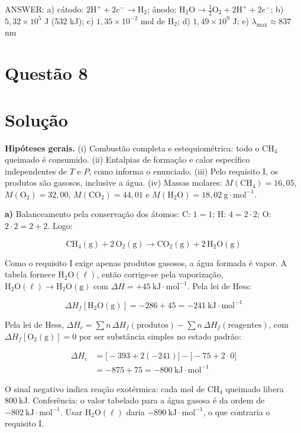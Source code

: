 \documentclass{article}%
\begin{document}
ANSWER: a) cátodo: $2\text{H}^{+}+2e^{-}\rightarrow\text{H}_2$; ânodo: $\text{H}_2\text{O}\rightarrow\tfrac{1}{2}\text{O}_2+2\text{H}^{+}+2e^{-}$; b) $5{,}32\times10^{5}$ J (532 kJ); c) $1{,}35\times10^{-2}$ mol de $\text{H}_2$; d) $1{,}49\times10^{9}$ J; e) $\lambda_{\max}\approx 837$ nm
%
\newpage%
\section*{Questão 8}

\section*{Solução}

\textbf{Hipóteses gerais.} (i) Combustão completa e estequiométrica: todo o CH$_4$ queimado é consumido. (ii) Entalpias de formação e calor específico independentes de $T$ e $P$, como informa o enunciado. (iii) Pelo requisito I, os produtos são gasosos, inclusive a água. (iv) Massas molares: $M(\mathrm{CH_4})=16{,}05$, $M(\mathrm{O_2})=32{,}00$, $M(\mathrm{CO_2})=44{,}01$ e $M(\mathrm{H_2O})=18{,}02\ \text{g}\cdot\text{mol}^{-1}$.

\textbf{a)} Balanceamento pela conservação dos átomos: C: $1=1$; H: $4=2\cdot2$; O: $2\cdot2=2+2$. Logo:

\[ \mathrm{CH_4(g)}+2\,\mathrm{O_2(g)}\rightarrow\mathrm{CO_2(g)}+2\,\mathrm{H_2O(g)} \]

Como o requisito I exige apenas produtos gasosos, a água formada é vapor. A tabela fornece $\mathrm{H_2O(\ell)}$, então corrige-se pela vaporização, $\mathrm{H_2O(\ell)}\rightarrow\mathrm{H_2O(g)}$ com $\Delta H=+45\ \text{kJ}\cdot\text{mol}^{-1}$. Pela lei de Hess:

\[ \Delta H_f[\mathrm{H_2O(g)}]=-286+45=-241\ \text{kJ}\cdot\text{mol}^{-1} \]

Pela lei de Hess, $\Delta H_c=\sum n\,\Delta H_f(\text{produtos})-\sum n\,\Delta H_f(\text{reagentes})$, com $\Delta H_f[\mathrm{O_2(g)}]=0$ por ser substância simples no estado padrão:

\begin{align*}
\Delta H_c &= \big[-393+2(-241)\big]-\big[-75+2\cdot0\big]\\
&= -875+75=-800\ \text{kJ}\cdot\text{mol}^{-1}
\end{align*}

O sinal negativo indica reação exotérmica: cada mol de CH$_4$ queimado libera $800\ \text{kJ}$. Conferência: o valor tabelado para a água gasosa é da ordem de $-802\ \text{kJ}\cdot\text{mol}^{-1}$. Usar $\mathrm{H_2O(\ell)}$ daria $-890\ \text{kJ}\cdot\text{mol}^{-1}$, o que contraria o requisito I.
\end{document}
